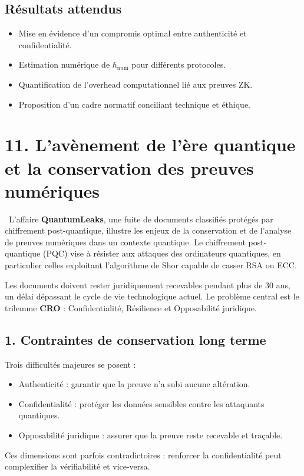 \documentclass[12pt,a4paper]{report}
\begin{document}
{	\subsection*{Résultats attendus}
	\begin{itemize}
		\item Mise en évidence d’un compromis optimal entre authenticité et confidentialité.
		\item Estimation numérique de $\hbar_{\text{num}}$ pour différents protocoles.
		\item Quantification de l’overhead computationnel lié aux preuves ZK.
		\item Proposition d’un cadre normatif conciliant technique et éthique.
	\end{itemize}
	\section*{11. L’avènement de l’ère quantique et la conservation des preuves numériques}\
	L’affaire \textbf{QuantumLeaks}, une fuite de documents classifiés protégés par chiffrement post-quantique, illustre les enjeux de la conservation et de l’analyse de preuves numériques dans un contexte quantique. Le chiffrement post-quantique (PQC) vise à résister aux attaques des ordinateurs quantiques, en particulier celles exploitant l’algorithme de Shor capable de casser RSA ou ECC.
	
	
	Les documents doivent rester juridiquement recevables pendant plus de 30 ans, un délai dépassant le cycle de vie technologique actuel. Le problème central est le trilemme \textbf{CRO} : Confidentialité, Résilience et Opposabilité juridique.
	
	
	\subsection*{1. Contraintes de conservation long terme}
	Trois difficultés majeures se posent :
	\begin{itemize}
		\item Authenticité : garantir que la preuve n'a subi aucune altération.
		\item Confidentialité : protéger les données sensibles contre les attaquants quantiques.
		\item Opposabilité juridique : assurer que la preuve reste recevable et traçable.
	\end{itemize}
	Ces dimensions sont parfois contradictoires : renforcer la confidentialité peut complexifier la vérifiabilité et vice-versa.
	
}
\end{document}
